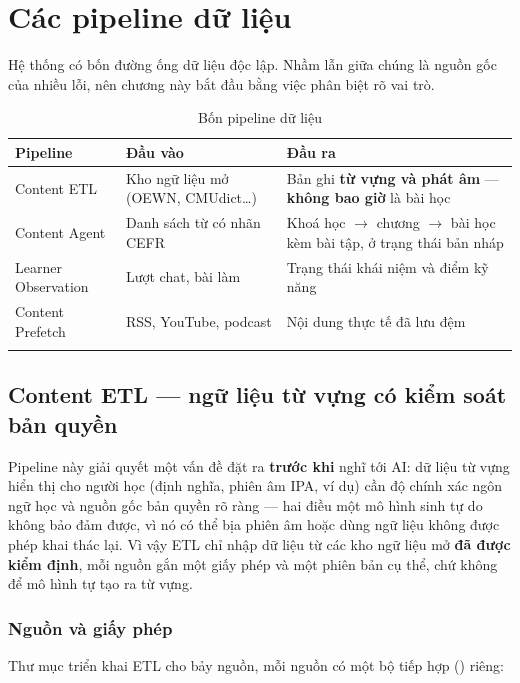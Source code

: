 \chapter{Các pipeline dữ liệu}

Hệ thống có bốn đường ống dữ liệu độc lập. Nhầm lẫn giữa chúng là nguồn gốc của nhiều lỗi,
nên chương này bắt đầu bằng việc phân biệt rõ vai trò.

\begin{longtable}{L{3.4cm} L{4.6cm} L{5.6cm}}
\toprule
\textbf{Pipeline} & \textbf{Đầu vào} & \textbf{Đầu ra}\\
\midrule
\endhead
Content ETL & Kho ngữ liệu mở (OEWN, CMUdict\ldots) & Bản ghi \textbf{từ vựng và phát âm} — \textbf{không bao giờ} là bài học\\
Content Agent & Danh sách từ có nhãn CEFR & Khoá học $\rightarrow$ chương $\rightarrow$ bài học kèm bài tập, ở trạng thái bản nháp\\
Learner Observation & Lượt chat, bài làm & Trạng thái khái niệm và điểm kỹ năng\\
Content Prefetch & RSS, YouTube, podcast & Nội dung thực tế đã lưu đệm\\
\bottomrule
\caption{Bốn pipeline dữ liệu}
\end{longtable}

\section{Content ETL — ngữ liệu từ vựng có kiểm soát bản quyền}

Pipeline này giải quyết một vấn đề đặt ra \textbf{trước khi} nghĩ tới AI: dữ liệu từ vựng
hiển thị cho người học (định nghĩa, phiên âm IPA, ví dụ) cần độ chính xác ngôn ngữ học và
nguồn gốc bản quyền rõ ràng — hai điều một mô hình sinh tự do không bảo đảm được, vì nó có
thể bịa phiên âm hoặc dùng ngữ liệu không được phép khai thác lại. Vì vậy ETL chỉ nhập dữ
liệu từ các kho ngữ liệu mở \textbf{đã được kiểm định}, mỗi nguồn gắn một giấy phép và một
phiên bản cụ thể, chứ không để mô hình tự tạo ra từ vựng.

\subsection{Nguồn và giấy phép}

Thư mục  triển khai ETL cho bảy nguồn, mỗi
nguồn có một bộ tiếp hợp () riêng:

